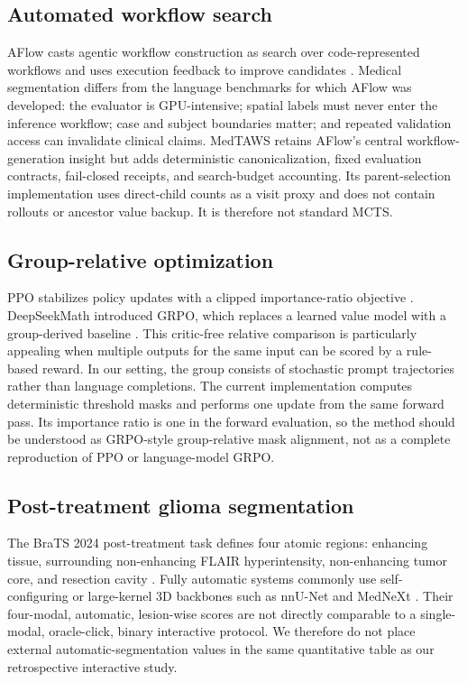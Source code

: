 \documentclass[10pt]{article}
\begin{document}
\subsection{Automated workflow search}
AFlow casts agentic workflow construction as search over code-represented workflows and uses execution feedback to improve candidates \cite{aflow}. Medical segmentation differs from the language benchmarks for which AFlow was developed: the evaluator is GPU-intensive; spatial labels must never enter the inference workflow; case and subject boundaries matter; and repeated validation access can invalidate clinical claims. MedTAWS retains AFlow's central workflow-generation insight but adds deterministic canonicalization, fixed evaluation contracts, fail-closed receipts, and search-budget accounting. Its parent-selection implementation uses direct-child counts as a visit proxy and does not contain rollouts or ancestor value backup. It is therefore not standard MCTS.

\subsection{Group-relative optimization}
PPO stabilizes policy updates with a clipped importance-ratio objective \cite{ppo}. DeepSeekMath introduced GRPO, which replaces a learned value model with a group-derived baseline \cite{deepseekmath}. This critic-free relative comparison is particularly appealing when multiple outputs for the same input can be scored by a rule-based reward. In our setting, the group consists of stochastic prompt trajectories rather than language completions. The current implementation computes deterministic threshold masks and performs one update from the same forward pass. Its importance ratio is one in the forward evaluation, so the method should be understood as GRPO-style group-relative mask alignment, not as a complete reproduction of PPO or language-model GRPO.

\subsection{Post-treatment glioma segmentation}
The BraTS 2024 post-treatment task defines four atomic regions: enhancing tissue, surrounding non-enhancing FLAIR hyperintensity, non-enhancing tumor core, and resection cavity \cite{brats2024}. Fully automatic systems commonly use self-configuring or large-kernel 3D backbones such as nnU-Net and MedNeXt \cite{nnunet,mednext}. Their four-modal, automatic, lesion-wise scores are not directly comparable to a single-modal, oracle-click, binary interactive protocol. We therefore do not place external automatic-segmentation values in the same quantitative table as our retrospective interactive study.
\end{document}

